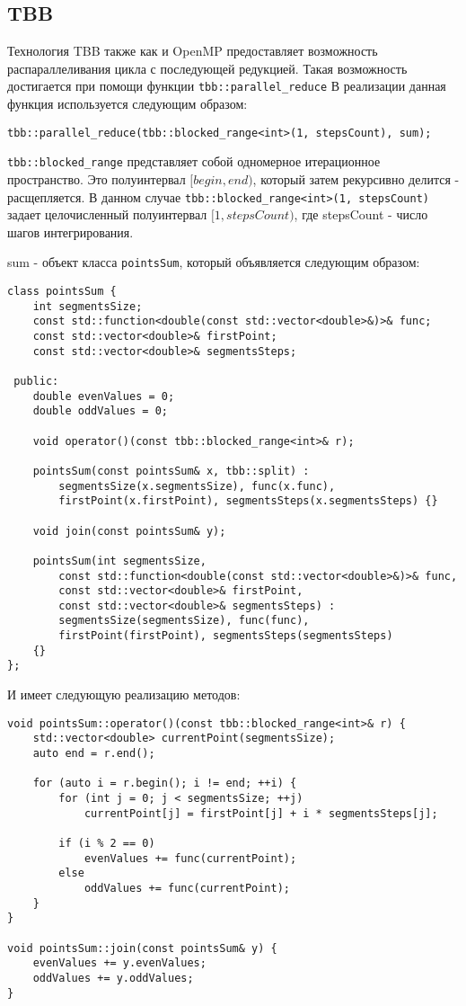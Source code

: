 \documentclass{report}
\begin{document}
\subsection*{TBB}
Технология TBB также как и OpenMP предоставляет возможность распараллеливания цикла с последующей редукцией. Такая возможность достигается при помощи функции \verb|tbb::parallel_reduce| В реализации данная функция используется следующим образом:
\begin{lstlisting}
tbb::parallel_reduce(tbb::blocked_range<int>(1, stepsCount), sum);
\end{lstlisting}
\par\verb|tbb::blocked_range| представляет собой одномерное итерационное пространство. Это полуинтервал $[begin, end)$, который затем рекурсивно делится - расщепляется. В данном случае \verb|tbb::blocked_range<int>(1, stepsCount)| задает целочисленный полуинтервал $[1, stepsCount)$, где stepsCount - число шагов интегрирования.
\par sum - объект класса \verb|pointsSum|, который объявляется следующим образом:
\begin{lstlisting}
class pointsSum {
    int segmentsSize;
    const std::function<double(const std::vector<double>&)>& func;
    const std::vector<double>& firstPoint;
    const std::vector<double>& segmentsSteps;

 public:
    double evenValues = 0;
    double oddValues = 0;

    void operator()(const tbb::blocked_range<int>& r);

    pointsSum(const pointsSum& x, tbb::split) :
        segmentsSize(x.segmentsSize), func(x.func),
        firstPoint(x.firstPoint), segmentsSteps(x.segmentsSteps) {}

    void join(const pointsSum& y);

    pointsSum(int segmentsSize,
        const std::function<double(const std::vector<double>&)>& func,
        const std::vector<double>& firstPoint,
        const std::vector<double>& segmentsSteps) :
        segmentsSize(segmentsSize), func(func),
        firstPoint(firstPoint), segmentsSteps(segmentsSteps)
    {}
};
\end{lstlisting}
\par И имеет следующую реализацию методов:
\begin{lstlisting}
void pointsSum::operator()(const tbb::blocked_range<int>& r) {
    std::vector<double> currentPoint(segmentsSize);
    auto end = r.end();

    for (auto i = r.begin(); i != end; ++i) {
        for (int j = 0; j < segmentsSize; ++j)
            currentPoint[j] = firstPoint[j] + i * segmentsSteps[j];

        if (i % 2 == 0)
            evenValues += func(currentPoint);
        else
            oddValues += func(currentPoint);
    }
}

void pointsSum::join(const pointsSum& y) {
    evenValues += y.evenValues;
    oddValues += y.oddValues;
}
\end{lstlisting}
\end{document}
